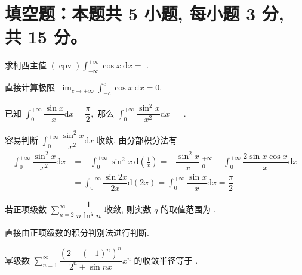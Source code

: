\section{填空题：本题共 5 小题, 每小题 3 分, 共 15 分。}



\begin{question}
求柯西主值 $\displaystyle (\operatorname{cpv})\int_{-\infty}^{+\infty} \cos x ~ \mathrm{d}x =$ \fillin[0].
\end{question}

\begin{solution}
直接计算极限 $\displaystyle \lim_{c\to+\infty} \int_{-c}^{c} \cos x ~ \mathrm{d}x = 0.$
\end{solution}

\begin{question}
已知 $\displaystyle \int_0^{+\infty} \dfrac{\sin x}{x} \mathrm{d}x = \dfrac{\pi}{2},$ 那么 $\displaystyle \int_0^{+\infty} \dfrac{\sin^2 x}{x^2} \mathrm{d}x =$ \fillin[$\dfrac{\pi}{2}$].
\end{question}

\begin{solution}
容易判断 $\displaystyle \int_0^{+\infty} \dfrac{\sin^2 x}{x^2} \mathrm{d}x$ 收敛. 由分部积分法有
\begin{align*}
\int_0^{+\infty} \dfrac{\sin^2 x}{x^2} \mathrm{d}x & = - \int_0^{+\infty} \sin^2 x ~\mathrm{d} \left(\frac{1}{x}\right) = - \dfrac{\sin^2 x}{x} \bigg|_0^{+\infty} + \int_0^{+\infty} \dfrac{2\sin x \cos x}{x} \mathrm{d}x \\
& = \int_0^{+\infty} \dfrac{\sin 2x}{2x} \mathrm{d}(2x) = \int_0^{+\infty} \dfrac{\sin x}{x} \mathrm{d}x = \dfrac{\pi}{2}
\end{align*}
\end{solution}

\begin{question}
若正项级数 $\displaystyle \sum_{n=2}^\infty \dfrac{1}{n \ln^q n}$ 收敛, 则实数 $q$ 的取值范围为 \fillin[$q > 1$].
\end{question}

\begin{solution}
直接由正项级数的积分判别法进行判断.
\end{solution}

\begin{question}
幂级数 $\displaystyle \sum\limits_{n=1}^{\infty} \dfrac{\left( 2 + (-1)^n \right)^n}{2^n + \sin nx} x^n$ 的收敛半径等于 \fillin[$\dfrac{2}{3}$].
\end{question}

